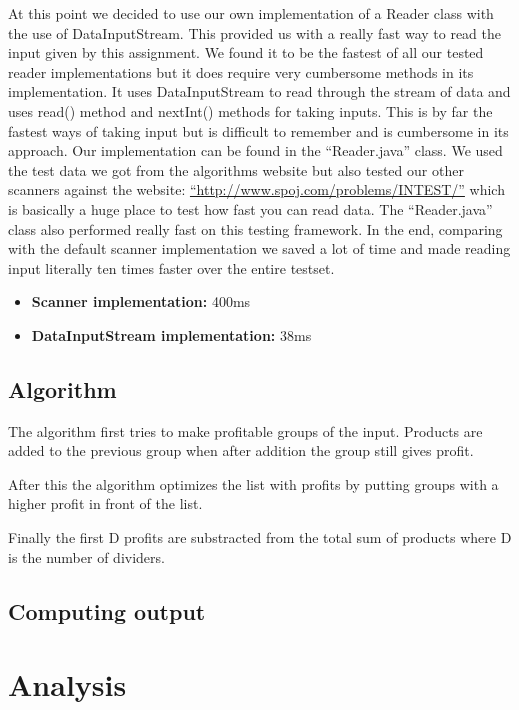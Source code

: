 \documentclass{article}
\begin{document}
At this point we decided to use our own implementation of a Reader class with the use of DataInputStream. This provided us with a really fast way to read the input given by this assignment. We found it to be the fastest of all our tested reader implementations but it does require very cumbersome methods in its implementation. It uses DataInputStream to read through the stream of data and uses read() method and nextInt() methods for taking inputs. This is by far the fastest ways of taking input but is difficult to remember and is cumbersome in its approach. Our implementation can be found in the ``Reader.java'' class. We used the test data we got from the algorithms website but also tested our other scanners against the website: \hyperref[http://www.spoj.com/problems/INTEST/]{``http://www.spoj.com/problems/INTEST/''} which is basically a huge place to test how fast you can read data. The ``Reader.java'' class also performed really fast on this testing framework. In the end, comparing with the default scanner implementation we saved a lot of time and made reading input literally ten times faster over the entire testset.
\begin{itemize}
\item \textbf{Scanner implementation:} 400ms
\item \textbf{DataInputStream implementation:} 38ms
\end{itemize}

\subsection{Algorithm}
The algorithm first tries to make profitable groups of the input. Products are added to the previous group when after addition the group still gives profit.

After this the algorithm optimizes the list with profits by putting groups with a higher profit in front of the list.

Finally the first D profits are substracted from the total sum of products where D is the number of dividers.

\subsection{Computing output}

\newpage
\section{Analysis}
\end{document}
